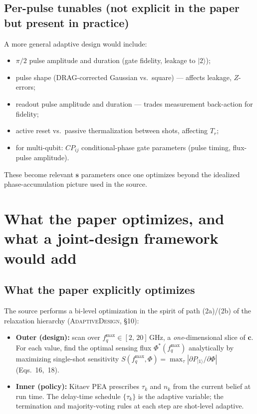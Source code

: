 \documentclass[11pt,a4paper]{article}
\begin{document}
\subsection{Per-pulse tunables (not explicit in the paper but present in practice)}

A more general adaptive design would include:
\begin{itemize}[nosep,leftmargin=2em]
  \item $\pi/2$ pulse amplitude and duration (gate fidelity, leakage to $|2\rangle$);
  \item pulse shape (DRAG-corrected Gaussian vs.\ square) --- affects leakage, $Z$-errors;
  \item readout pulse amplitude and duration --- trades measurement back-action for fidelity;
  \item active reset vs.\ passive thermalization between shots, affecting $T_r$;
  \item for multi-qubit: $CP_{ij}$ conditional-phase gate parameters (pulse timing, flux-pulse amplitude).
\end{itemize}
These become relevant $\bm{s}$ parameters once one optimizes beyond the idealized phase-accumulation picture used in the source.

\section{What the paper optimizes, and what a joint-design framework would add}

\subsection{What the paper explicitly optimizes}

The source performs a bi-level optimization in the spirit of path (2a)/(2b) of the relaxation hierarchy (\textsc{AdaptiveDesign}, \S10):
\begin{itemize}[nosep,leftmargin=2em]
  \item \textbf{Outer (design):}  scan over $f_q^{\max} \in [2,\,20]\,$GHz, a \emph{one}-dimensional slice of $\bm{c}$.  For each value, find the optimal sensing flux $\Phi^*(f_q^{\max})$ analytically by maximizing single-shot sensitivity $S(f_q^{\max},\Phi) = \max_\tau |\partial P_{|1\rangle}/\partial\Phi|$ (Eqs.~16,~18).
  \item \textbf{Inner (policy):}  Kitaev PEA prescribes $\tau_k$ and $n_k$ from the current belief at run time.  The delay-time schedule $\{\tau_k\}$ is the adaptive variable; the termination and majority-voting rules at each step are shot-level adaptive.
\end{itemize}
\end{document}
